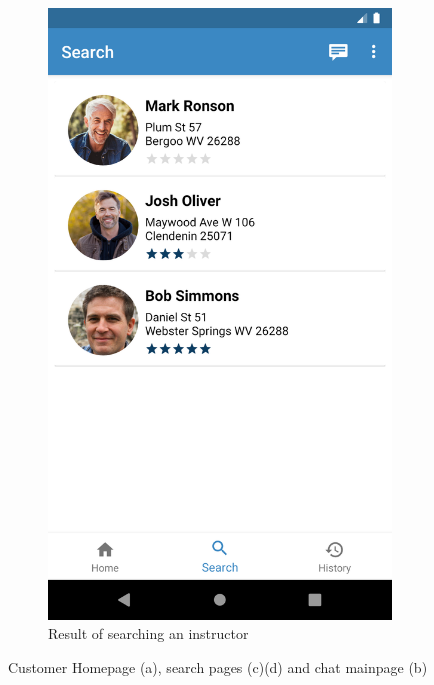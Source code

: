 \begin{samepage}
\begin{figure}[h]
\begin{subfigure}{.5\textwidth}
  \includegraphics[height=.3\textheight, keepaspectratio=true]{Img/CustomerSearch2}
  \caption{Result of searching an instructor}
\end{subfigure}
  \caption{Customer Homepage (a), search pages (c)(d) and chat mainpage (b)}
\end{figure}
\end{samepage}
\clearpage
